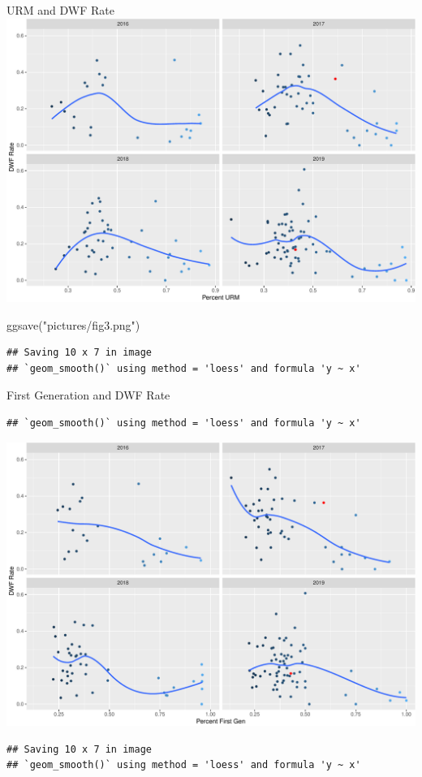 \documentclass[
  ignorenonframetext,
]{beamer}
\newenvironment{Shaded}{\begin{snugshade}}{\end{snugshade}}
\newcommand{\FunctionTok}[1]{\textcolor[rgb]{0.00,0.00,0.00}{#1}}
\newcommand{\NormalTok}[1]{#1}
\newcommand{\StringTok}[1]{\textcolor[rgb]{0.31,0.60,0.02}{#1}}
\begin{document}
\begin{frame}[fragile]{URM and DWF Rate}
\includegraphics{presentation_rica_files/figure-beamer/cars-1.pdf}

\begin{Shaded}
\begin{Highlighting}[]
\FunctionTok{ggsave}\NormalTok{(}\StringTok{"pictures/fig3.png"}\NormalTok{)}
\end{Highlighting}
\end{Shaded}

\begin{verbatim}
## Saving 10 x 7 in image
## `geom_smooth()` using method = 'loess' and formula 'y ~ x'
\end{verbatim}
\end{frame}

\begin{frame}[fragile]{First Generation and DWF Rate}
\protect\hypertarget{first-generation-and-dwf-rate}{}
\begin{verbatim}
## `geom_smooth()` using method = 'loess' and formula 'y ~ x'
\end{verbatim}

\includegraphics{presentation_rica_files/figure-beamer/pressure-1.pdf}

\begin{verbatim}
## Saving 10 x 7 in image
## `geom_smooth()` using method = 'loess' and formula 'y ~ x'
\end{verbatim}
\end{frame}
\end{document}
